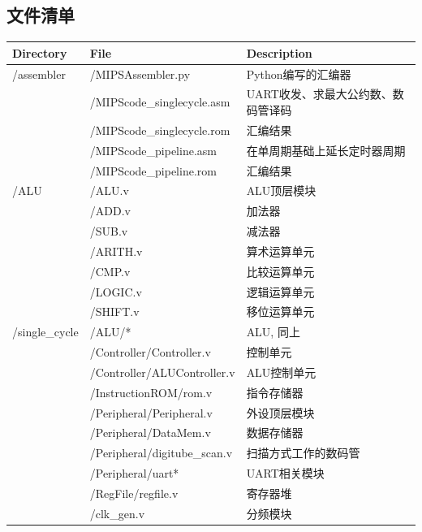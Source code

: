 \documentclass{article}
\begin{document}
        \subsection{文件清单}
            \begin{longtable}{l|ll}
                \toprule
                Directory & File & Description \\
                \midrule
                \endhead
                \bottomrule
                \endfoot
                /assembler & /MIPSAssembler.py & Python编写的汇编器 \\
                & /MIPScode\_singlecycle.asm & UART收发、求最大公约数、数码管译码 \\
                & /MIPScode\_singlecycle.rom & 汇编结果 \\
                & /MIPScode\_pipeline.asm & 在单周期基础上延长定时器周期 \\
                & /MIPScode\_pipeline.rom & 汇编结果 \\
                \midrule
                /ALU & /ALU.v & ALU顶层模块 \\
                & /ADD.v & 加法器 \\
                & /SUB.v & 减法器 \\
                & /ARITH.v & 算术运算单元 \\
                & /CMP.v & 比较运算单元 \\
                & /LOGIC.v & 逻辑运算单元 \\
                & /SHIFT.v & 移位运算单元 \\
                \midrule
                /single\_cycle & /ALU/* & ALU, 同上 \\
                & /Controller/Controller.v & 控制单元 \\
                & /Controller/ALUController.v & ALU控制单元 \\
                & /InstructionROM/rom.v & 指令存储器 \\
                & /Peripheral/Peripheral.v & 外设顶层模块 \\
                & /Peripheral/DataMem.v & 数据存储器 \\
                & /Peripheral/digitube\_scan.v & 扫描方式工作的数码管 \\
                & /Peripheral/uart* & UART相关模块 \\
                & /RegFile/regfile.v & 寄存器堆 \\
                & /clk\_gen.v & 分频模块 \\

\end{longtable}
\end{document}
